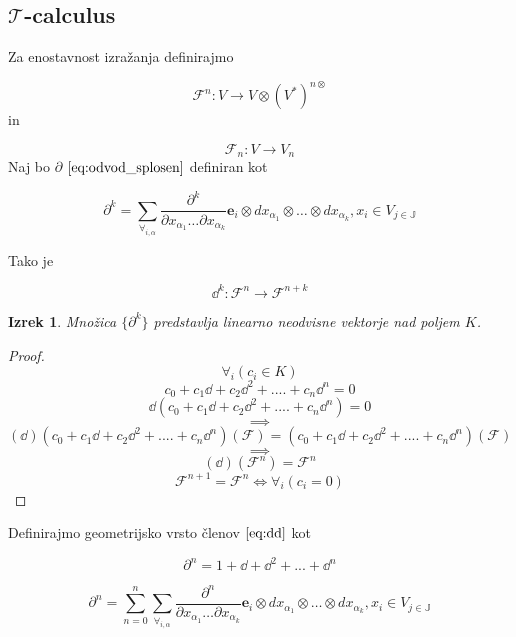\documentclass{article}
\newcommand{\JJ}{\mathbb{J}}
\newcommand{\T}{\mathcal{T}}
\newcommand{\e}{\mathbf{e}}
\newcommand{\F}{\mathcal{F}}
\newcommand{\D}{\partial}
\newtheorem{izrek}{Izrek}[section]
\begin{document}
\subsection{$\T$-calculus}

Za enostavnost izražanja definirajmo
 
 \begin{equation}\label{eq:F^n}
 	\F^n:V\to V\otimes(V^*)^{n\otimes}
 \end{equation}
 in
 
 \begin{equation}\label{eq:F_n}
 	\F_n:V\to V_n
 \end{equation}
Naj bo $\partial$ $\eqref{eq:odvod_splosen}$ definiran kot

\begin{equation}\label{eq:dd}
	\partial^k=\sum_{\forall_{i,\alpha}}\frac{\partial^k}{\partial
	    x_{\alpha_1}\ldots \partial x_{\alpha_k}}\e_i\otimes
	  dx_{\alpha_1}\otimes\ldots \otimes dx_{\alpha_k} , x_i\in V_{j\in\JJ}
\end{equation}

Tako je
 
 \begin{equation}
 \dd^k:\F^n\to\F^{n+k}
 \end{equation}
 
 \begin{izrek}\label{izr:linearnaNeodvisnost}
  Množica $\{\partial^k\}$ predstavlja linearno neodvisne vektorje nad poljem $K$.
 \end{izrek}
 
 \begin{proof} 
 $$\forall_i(c_i\in K)$$
	  $$c_0+c_1\dd+c_2\dd^2+....+c_n\dd^n=0$$
	$$\dd(c_0+c_1\dd+c_2\dd^2+....+c_n\dd^n)=0$$
	$$\implies$$
	$$(\dd)(c_0+c_1\dd+c_2\dd^2+....+c_n\dd^n)(\F)=(c_0+c_1\dd+c_2\dd^2+....+c_n\dd^n)(\F)$$
	$$\implies$$
	$$(\dd)(\F^n)=\F^n$$
	$$\F^{n+1}=\F^n\iff\forall_i(c_i=0)$$
	
 \end{proof}
 Definirajmo geometrijsko vrsto členov $\eqref{eq:dd}$ kot
 
 \begin{equation}\label{eq:DD}
  	\D^n=1+\dd+\dd^2+...+\dd^n
  \end{equation}
  
  \begin{equation}
  	\D^n=\sum\limits_{n=0}^{n}\sum_{\forall_{i,\alpha}}\frac{\partial^n}{\partial
  		    x_{\alpha_1}\ldots \partial x_{\alpha_k}}\e_i\otimes
  		  dx_{\alpha_1}\otimes\ldots \otimes dx_{\alpha_k} , x_i\in V_{j\in\JJ}
  \end{equation}
  
\end{document}
